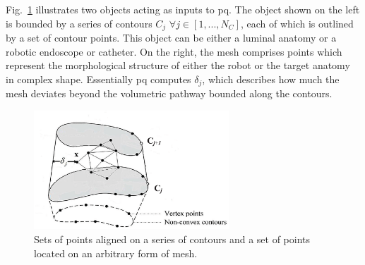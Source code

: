 Fig.~\ref{fig:pqa} illustrates two objects acting as inputs to \gls{pq}. 
The object shown on the left is bounded by a series of contours $C_j$ $\forall j \in [1,...,N_C]$, each of which is outlined by a set of contour points. 
This object can be either a luminal anatomy or a robotic endoscope or catheter. 
On the right, the mesh comprises points which represent the morphological structure of either the robot or the target anatomy in complex shape. 
Essentially \gls{pq} computes $\delta_j$, which describes how much the mesh deviates beyond the volumetric pathway bounded along the contours.

\begin{figure}[ht]
\begin{center}
\includegraphics[width=0.65\textwidth]{2_background/figures/pqa}
\end{center}
\caption[Sets of points aligned on a series of contours and a set of points located on an arbitrary form of mesh.]{Sets of points aligned on a series of contours and a set of points located on an arbitrary form of mesh.}
\label{fig:pqa}
\end{figure}

